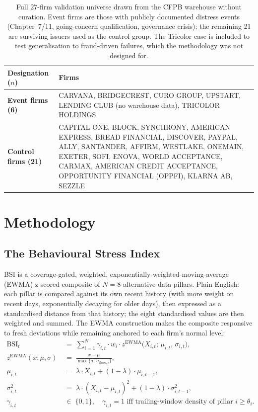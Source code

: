 \documentclass[11pt,a4paper]{article}
\begin{document}
\begin{table}[h]
\centering\small
\begin{tabular}{@{}p{3.5cm}p{10.5cm}@{}}
\toprule
\textbf{Designation ($n$)} & \textbf{Firms} \\
\midrule
\textbf{Event firms (6)}   & CARVANA, BRIDGECREST, CURO GROUP, UPSTART, LENDING CLUB (no warehouse data), TRICOLOR HOLDINGS \\
\textbf{Control firms (21)} & CAPITAL ONE, BLOCK, SYNCHRONY, AMERICAN EXPRESS, BREAD FINANCIAL, DISCOVER, PAYPAL, ALLY, SANTANDER, AFFIRM, WESTLAKE, ONEMAIN, EXETER, SOFI, ENOVA, WORLD ACCEPTANCE, CARMAX, AMERICAN CREDIT ACCEPTANCE, OPPORTUNITY FINANCIAL (OPPFI), KLARNA AB, SEZZLE \\
\bottomrule
\end{tabular}
\caption{Full 27-firm validation universe drawn from the CFPB warehouse without curation. Event firms are those with publicly documented distress events (Chapter~7/11, going-concern qualification, governance crisis); the remaining 21 are surviving issuers used as the control group. The Tricolor case is included to test generalisation to fraud-driven failures, which the methodology was not designed for.}\label{tab:universe}
\end{table}

\section{Methodology}\label{sec:methodology}

\subsection{The Behavioural Stress Index}

BSI is a coverage-gated, weighted, exponentially-weighted-moving-average (EWMA) z-scored composite of $N = 8$ alternative-data pillars. Plain-English: each pillar is compared against its own recent history (with more weight on recent days, exponentially decaying for older days), then expressed as a standardised distance from that history; the eight standardised values are then weighted and summed. The EWMA construction makes the composite responsive to fresh deviations while remaining anchored to each firm's normal level:
\begin{align}
\text{BSI}_t \;&=\; \sum_{i=1}^{N} \gamma_{i,t} \cdot w_i \cdot z^{\text{EWMA}}\!\big(X_{i,t};\,\mu_{i,t},\,\sigma_{i,t}\big), \label{eq:bsi}\\[3pt]
z^{\text{EWMA}}(x;\mu,\sigma) \;&=\; \frac{x - \mu}{\max\{\sigma,\,\sigma_{\text{floor},i}\}}, \label{eq:zewma}\\[3pt]
\mu_{i,t} \;&=\; \lambda \cdot X_{i,t} + (1 - \lambda) \cdot \mu_{i,t-1}, \label{eq:ewma_mu}\\
\sigma^{2}_{i,t} \;&=\; \lambda \cdot (X_{i,t} - \mu_{i,t})^{2} + (1 - \lambda) \cdot \sigma^{2}_{i,t-1}, \label{eq:ewma_sigma}\\
\gamma_{i,t} \;&\in\; \{0,1\}, \quad \gamma_{i,t} = 1 \text{ iff trailing-window density of pillar } i \ge \theta_i. \label{eq:gamma}
\end{align}
\end{document}
